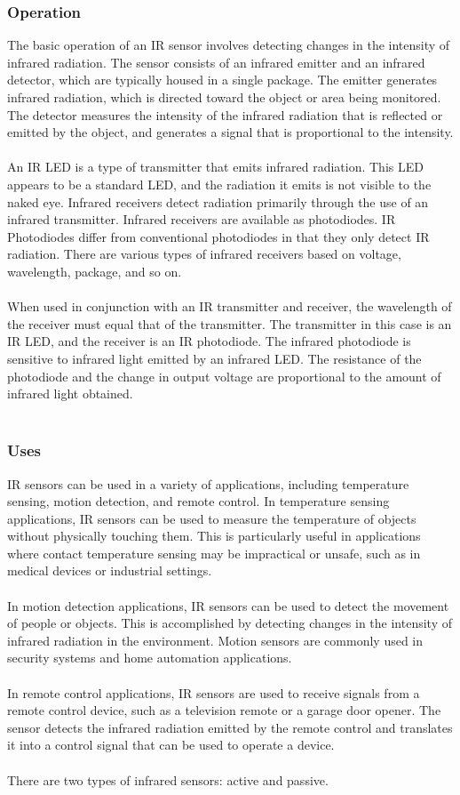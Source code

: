 \documentclass[12pt]{article}
\begin{document}
\subsubsection{Operation}
The basic operation of an IR sensor involves detecting changes in the intensity of infrared radiation. The sensor consists of an infrared emitter and an infrared detector, which are typically housed in a single package. The emitter generates infrared radiation, which is directed toward the object or area being monitored. The detector measures the intensity of the infrared radiation that is reflected or emitted by the object, and generates a signal that is proportional to the intensity.
\\
\\
An IR LED is a type of transmitter that emits infrared radiation. This LED appears to be a standard LED, and the radiation it emits is not visible to the naked eye. Infrared receivers detect radiation primarily through the use of an infrared transmitter. Infrared receivers are available as photodiodes. IR Photodiodes differ from conventional photodiodes in that they only detect IR radiation. There are various types of infrared receivers based on voltage, wavelength, package, and so on.
\\
\\
When used in conjunction with an IR transmitter and receiver, the wavelength of the receiver must equal that of the transmitter. The transmitter in this case is an IR LED, and the receiver is an IR photodiode. The infrared photodiode is sensitive to infrared light emitted by an infrared LED. The resistance of the photodiode and the change in output voltage are proportional to the amount of infrared light obtained.
\\
\\
\subsubsection{Uses}
IR sensors can be used in a variety of applications, including temperature sensing, motion detection, and remote control. In temperature sensing applications, IR sensors can be used to measure the temperature of objects without physically touching them. This is particularly useful in applications where contact temperature sensing may be impractical or unsafe, such as in medical devices or industrial settings.
\\
\\
In motion detection applications, IR sensors can be used to detect the movement of people or objects. This is accomplished by detecting changes in the intensity of infrared radiation in the environment. Motion sensors are commonly used in security systems and home automation applications.
\\
\\
In remote control applications, IR sensors are used to receive signals from a remote control device, such as a television remote or a garage door opener. The sensor detects the infrared radiation emitted by the remote control and translates it into a control signal that can be used to operate a device.
\\
\\
There are two types of infrared sensors: active and passive. 
\end{document}
